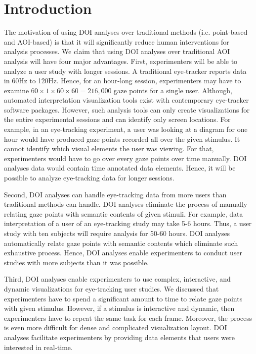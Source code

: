 \section{Introduction}
The motivation of using DOI analyses over traditional methods (i.e. point-based and AOI-based) is that it will significantly reduce human interventions for analysis processes. We claim that using DOI analyses over traditional AOI analysis will have four major advantages. First, experimenters will be able to analyze a user study with longer sessions. A traditional eye-tracker reports data in 60Hz to 120Hz. Hence, for an hour-long session, experimenters may have to examine $ 60 \times 1 \times 60 \times 60 =216,000$ gaze points for a single user. Although, automated interpretation visualization tools exist with contemporary eye-tracker software packages. However, such analysis tools can only create visualizations for the entire experimental sessions and can identify only screen locations. For example, in an eye-tracking experiment, a user was looking at a diagram for one hour would have produced gaze points recorded all over the given stimulus. It cannot identify which visual elements the user was viewing. For that, experimenters would have to go over every gaze points over time manually. DOI analyses data would contain time annotated data elements. Hence, it will be possible to analyze eye-tracking data for longer sessions.  

Second, DOI analyses can handle eye-tracking data from more users than traditional methods can handle. DOI analyses eliminate the process of manually relating gaze points with semantic contents of given stimuli.  For example, data interpretation of a user of an eye-tracking study may take 5-6 hours. Thus, a user study with ten subjects will require analysis for 50-60 hours. DOI analyses automatically relate gaze points with semantic contents which eliminate such exhaustive process. Hence, DOI analyses enable experimenters to conduct user studies with more subjects than it was possible.

Third, DOI analyses enable experimenters to use complex, interactive, and dynamic visualizations for eye-tracking user studies. We discussed that experimenters have to spend a significant amount to time to relate gaze points with given stimulus. However, if a stimulus is interactive and dynamic, then experimenters have to repeat the same task for each frame. Moreover, the process is even more difficult for dense and complicated visualization layout. DOI analyses facilitate experimenters by providing data elements that users were interested in real-time.


